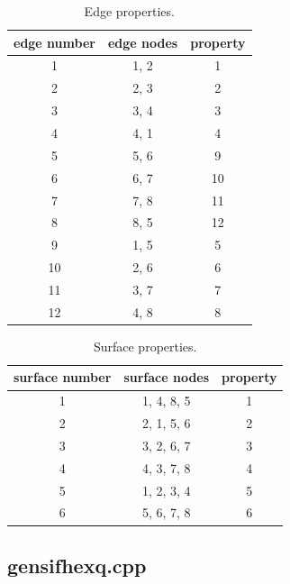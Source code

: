 \documentclass[12pt]{book}
\begin{document}
\begin{table}
\begin{center}
\begin{tabular}{|c|c|c|}
\hline
edge number & edge nodes & property
\\ \hline
1 & 1, 2 & 1
\\ \hline
2 & 2, 3 & 2
\\ \hline
3 & 3, 4 & 3
\\ \hline
4 & 4, 1 & 4
\\ \hline
5 & 5, 6 & 9
\\ \hline
6 & 6, 7 & 10
\\ \hline
7 & 7, 8 & 11
\\ \hline
8 & 8, 5 & 12
\\ \hline
9 & 1, 5 & 5
\\ \hline
10 & 2, 6 & 6
\\ \hline
11 & 3, 7 & 7
\\ \hline
12 & 4, 8 & 8
\\ \hline
\end{tabular}
\caption{Edge properties.}
\end{center}
\end{table}

\begin{table}
\begin{center}
\begin{tabular}{|c|c|c|}
\hline
surface number & surface nodes& property
\\ \hline
1 & 1, 4, 8, 5 & 1
\\ \hline
2 & 2, 1, 5, 6 & 2
\\ \hline
3 & 3, 2, 6, 7 & 3
\\ \hline
4 & 4, 3, 7, 8 & 4
\\ \hline
5 & 1, 2, 3, 4 & 5
\\ \hline
6 & 5, 6, 7, 8 & 6
\\ \hline
\end{tabular}
\caption{Surface properties.}
\end{center}
\end{table}

\subsection {gensifhexq.cpp}
\end{document}
